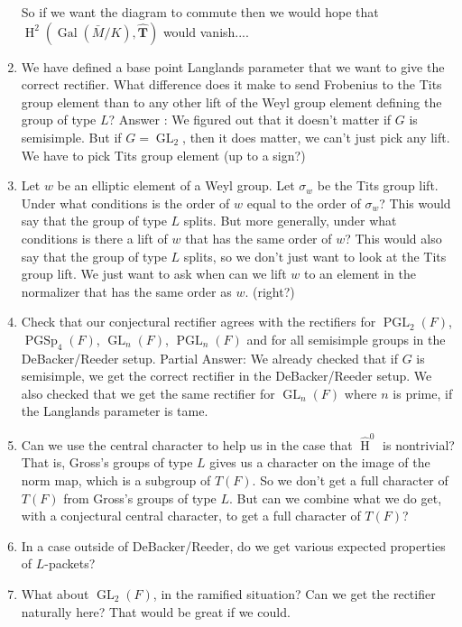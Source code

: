 \documentclass{article}
\DeclareMathOperator{\HH}{H}
\DeclareMathOperator{\Gal}{Gal}
\DeclareMathOperator{\GL}{GL}
\DeclareMathOperator{\PGL}{PGL}
\DeclareMathOperator{\PGSp}{PGSp}
\newcommand{\HT}[1]{\widehat{\HH}^{#1}}
\newcommand{\T}{\mathbf{T}}
\newcommand{\Th}{\hat{\T}}
\begin{document}
\begin{enumerate}
So if we want the diagram to commute then we would hope that $\HH^2(\Gal(\bar{M}/K), \Th)$ would vanish....

\item We have defined a base point Langlands parameter that we want to give the correct rectifier.  What difference does it make to send Frobenius to the Tits group element than to any other lift of the Weyl group element defining the group of type $L$?  Answer : We figured out that it doesn't matter if $G$ is semisimple.  But if $G = \GL_2$, then it does matter, we can't just pick any lift.  We have to pick Tits group element (up to a sign?)

\item Let $w$ be an elliptic element of a Weyl group.  Let $\sigma_w$ be the Tits group lift.  Under what conditions is the order of $w$ equal to the order of $\sigma_w$?  This would say that the group of type $L$ splits.  But more generally, under what conditions is there a lift of $w$ that has the same order of $w$?  This would also say that the group of type $L$ splits, so we don't just want to look at the Tits group lift.  We just want to ask when can we lift $w$ to an element in the normalizer that has the same order as $w$. (right?)

\item Check that our conjectural rectifier agrees with the rectifiers for $\PGL_2(F)$, $\PGSp_4(F)$, $\GL_n(F)$, $\PGL_n(F)$ and for all semisimple groups in the DeBacker/Reeder setup.  Partial Answer: We already checked that if $G$ is semisimple, we get the correct rectifier in the DeBacker/Reeder setup. We also checked that we get the same rectifier for $\GL_n(F)$ where $n$ is prime, if the Langlands parameter is tame.

\item Can we use the central character to help us in the case that $\HT{0}$ is nontrivial?  That is, Gross's groups of type $L$ gives us a character on the image of the norm map, which is a subgroup of $T(F)$.  So we don't get a full character of $T(F)$ from Gross's groups of type $L$.  But can we combine what we do get, with a conjectural central character, to get a full character of $T(F)$?

\item In a case outside of DeBacker/Reeder, do we get various expected properties of $L$-packets?

\item What about $\GL_2(F)$, in the ramified situation?  Can we get the rectifier naturally here?  That would be great if we could.


\end{enumerate}
\end{document}
